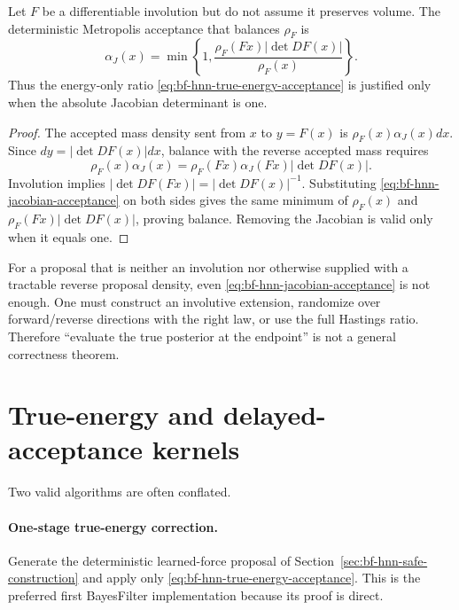 \begin{proposition}
\label{prop:bf-hnn-general-map-jacobian}
Let $F$ be a differentiable involution but do not assume it preserves volume.
The deterministic Metropolis acceptance that balances $\rho_F$ is
\begin{equation}
 \alpha_J(x)=\min\left\{1,
 \frac{\rho_F(Fx)|\det DF(x)|}{\rho_F(x)}\right\}.
 \label{eq:bf-hnn-jacobian-acceptance}
\end{equation}
Thus the energy-only ratio
\eqref{eq:bf-hnn-true-energy-acceptance} is justified only when the absolute
Jacobian determinant is one.
\end{proposition}

\begin{proof}
The accepted mass density sent from $x$ to $y=F(x)$ is
$\rho_F(x)\alpha_J(x)dx$.  Since $dy=|\det DF(x)|dx$, balance with the reverse
accepted mass requires
\begin{equation}
 \rho_F(x)\alpha_J(x)
 =\rho_F(Fx)\alpha_J(Fx)|\det DF(x)|.
\end{equation}
Involution implies
$|\det DF(Fx)|=|\det DF(x)|^{-1}$.  Substituting
\eqref{eq:bf-hnn-jacobian-acceptance} on both sides gives the same minimum of
$\rho_F(x)$ and $\rho_F(Fx)|\det DF(x)|$, proving balance.  Removing the
Jacobian is valid only when it equals one.
\end{proof}

For a proposal that is neither an involution nor otherwise supplied with a
tractable reverse proposal density, even
\eqref{eq:bf-hnn-jacobian-acceptance} is not enough.  One must construct an
involutive extension, randomize over forward/reverse directions with the right
law, or use the full Hastings ratio.  Therefore ``evaluate the true posterior
at the endpoint'' is not a general correctness theorem.

\section{True-energy and delayed-acceptance kernels}
\label{sec:bf-hnn-delayed-acceptance}

Two valid algorithms are often conflated.

\paragraph{One-stage true-energy correction.}
Generate the deterministic learned-force proposal of
Section~\ref{sec:bf-hnn-safe-construction} and apply only
\eqref{eq:bf-hnn-true-energy-acceptance}.  This is the preferred first
BayesFilter implementation because its proof is direct.

